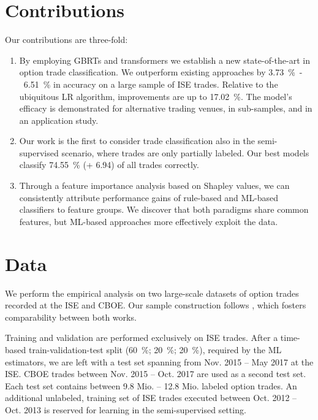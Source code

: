 \section{Contributions}

Our contributions are three-fold: 
\begin{enumerate}[label=(\roman*),noitemsep]
\item By employing \glspl{GBRT} and transformers we establish a new state-of-the-art in option trade classification. We outperform existing approaches by \SI{3.73}{\percent}~-~\SI{6.51}{\percent} in accuracy on a large sample of \gls{ISE} trades. Relative to the ubiquitous \gls{LR} algorithm, improvements are up to \SI{17.02}{\percent}. 
The model's efficacy is demonstrated for alternative trading venues, in sub-samples, and in an application study.
\item Our work is the first to consider trade classification also in the semi-supervised scenario, where trades are only partially labeled. Our best models classify \SI{74.55}{\percent} (+ 6.94) of all trades correctly.
\item Through a feature importance analysis based on Shapley values, we can consistently attribute performance gains of rule-based and \gls{ML}-based classifiers to feature groups. We discover that both paradigms share common features, but \gls{ML}-based approaches more effectively exploit the data.
\end{enumerate}

\section{Data}

We perform the empirical analysis on two large-scale datasets of option trades recorded at the \gls{ISE} and \gls{CBOE}. Our sample construction follows \textcite[][]{grauerOptionTradeClassification2022}, which fosters comparability between both works. 

Training and validation are performed exclusively on \gls{ISE} trades. After a time-based train-validation-test split (\SI{60}{\percent}; \SI{20}{\percent}; \SI{20}{\percent}), required by the \gls{ML} estimators, we are left with a test set spanning from Nov. 2015 -- May 2017 at the \gls{ISE}. \gls{CBOE} trades between Nov. 2015 -- Oct. 2017 are used as a second test set. Each test set contains between 9.8 Mio. --  12.8 Mio. labeled option trades. An additional unlabeled, training set of \gls{ISE} trades executed between Oct. 2012 -- Oct. 2013 is reserved for learning in the semi-supervised setting.

